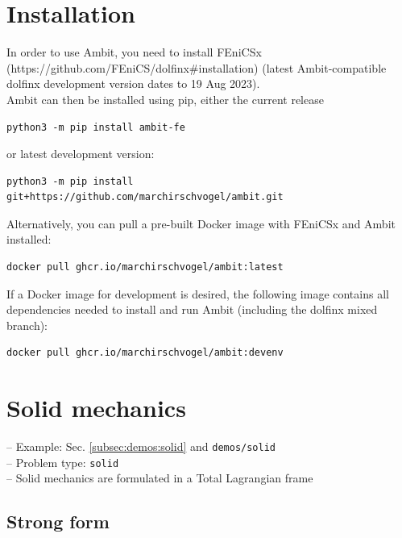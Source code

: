 \documentclass[a4paper,12pt]{report}
\begin{document}
\section{Installation}

In order to use Ambit, you need to install FEniCSx (https://github.com/FEniCS/dolfinx\#installation) (latest Ambit-compatible dolfinx development version dates to 19 Aug 2023).\\

Ambit can then be installed using pip, either the current release
\begin{verbatim}
python3 -m pip install ambit-fe
\end{verbatim}

or latest development version:
\begin{verbatim}
python3 -m pip install git+https://github.com/marchirschvogel/ambit.git
\end{verbatim}

Alternatively, you can pull a pre-built Docker image with FEniCSx and Ambit installed:
\begin{verbatim}
docker pull ghcr.io/marchirschvogel/ambit:latest
\end{verbatim}

If a Docker image for development is desired, the following image contains all dependencies needed to install and run Ambit (including the dolfinx mixed branch):
\begin{verbatim}
docker pull ghcr.io/marchirschvogel/ambit:devenv
\end{verbatim}

\section{Solid mechanics}\label{sec:solid}

-- Example: Sec. \ref{subsec:demos:solid} and \verb"demos/solid"\\

-- Problem type: \verb.solid.\\

-- Solid mechanics are formulated in a Total Lagrangian frame

\subsection{Strong form}
\end{document}
